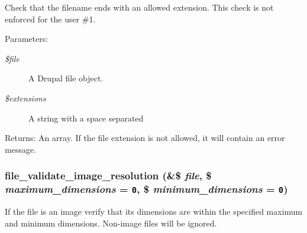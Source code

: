 Check that the filename ends with an allowed extension. This check is not enforced for the user \#1.

\begin{Desc}
\item[Parameters:]
\begin{description}
\item[{\em \$file}]A Drupal file object. \item[{\em \$extensions}]A string with a space separated \end{description}
\end{Desc}
\begin{Desc}
\item[Returns:]An array. If the file extension is not allowed, it will contain an error message. \end{Desc}
\hypertarget{group__file_gb6e58a5341acf0be4c030887836f75f6}{
\subsubsection[{file\_\-validate\_\-image\_\-resolution}]{\setlength{\rightskip}{0pt plus 5cm}file\_\-validate\_\-image\_\-resolution (\&\$ {\em file}, \/  \$ {\em maximum\_\-dimensions} = {\tt 0}, \/  \$ {\em minimum\_\-dimensions} = {\tt 0})}}
\label{group__file_gb6e58a5341acf0be4c030887836f75f6}


If the file is an image verify that its dimensions are within the specified maximum and minimum dimensions. Non-image files will be ignored.

